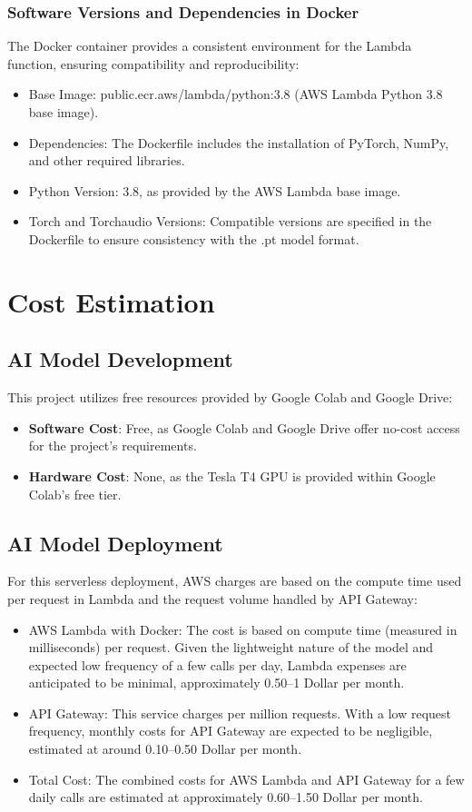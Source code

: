 \documentclass[conference]{IEEEtran}
\begin{document}
\subsubsection{Software Versions and Dependencies in Docker} 
The Docker container provides a consistent environment for the Lambda function, ensuring compatibility and reproducibility: 
\begin{itemize} 
    \item Base Image: public.ecr.aws/lambda/python:3.8 (AWS Lambda Python 3.8 base image).
    \item Dependencies: The Dockerfile includes the installation of PyTorch, NumPy, and other required libraries.
    \item Python Version: 3.8, as provided by the AWS Lambda base image.
    \item Torch and Torchaudio Versions: Compatible versions are specified in the Dockerfile to ensure consistency with the .pt model format.
\end{itemize}

\section{Cost Estimation}
\subsection{AI Model Development}
This project utilizes free resources provided by Google Colab and Google Drive:
\begin{itemize}
    \item \textbf{Software Cost}: Free, as Google Colab and Google Drive offer no-cost access for the project’s requirements.
    \item \textbf{Hardware Cost}: None, as the Tesla T4 GPU is provided within Google Colab’s free tier.
\end{itemize}

\subsection{AI Model Deployment} 
For this serverless deployment, AWS charges are based on the compute time used per request in Lambda and the request volume handled by API Gateway: 
\begin{itemize} 
    \item AWS Lambda with Docker: The cost is based on compute time (measured in milliseconds) per request. Given the lightweight nature of the model and expected low frequency of a few calls per day, Lambda expenses are anticipated to be minimal, approximately 0.50–1 Dollar per month. 
    \item API Gateway: This service charges per million requests. With a low request frequency, monthly costs for API Gateway are expected to be negligible, estimated at around 0.10–0.50 Dollar per month. 
    \item Total Cost: The combined costs for AWS Lambda and API Gateway for a few daily calls are estimated at approximately 0.60–1.50 Dollar per month. 
\end{itemize}
\end{document}
